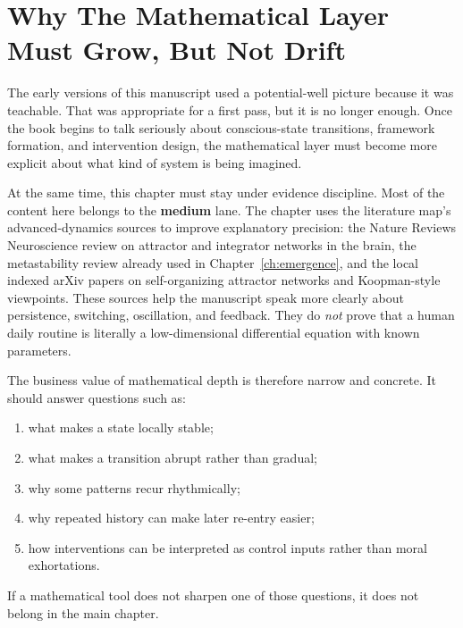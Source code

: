 \section{Why The Mathematical Layer Must Grow, But Not Drift}

The early versions of this manuscript used a potential-well picture because it
was teachable. That was appropriate for a first pass, but it is no longer
enough. Once the book begins to talk seriously about conscious-state
transitions, framework formation, and intervention design, the mathematical
layer must become more explicit about what kind of system is being imagined.

At the same time, this chapter must stay under evidence discipline. Most of the
content here belongs to the \textbf{medium} lane. The chapter uses the
literature map's advanced-dynamics sources to improve explanatory precision:
the Nature Reviews Neuroscience review on attractor and integrator networks in
the brain, the metastability review already used in Chapter~\ref{ch:emergence},
and the local indexed arXiv papers on self-organizing attractor networks and
Koopman-style viewpoints. These sources help the manuscript speak more clearly
about persistence, switching, oscillation, and feedback. They do \emph{not}
prove that a human daily routine is literally a low-dimensional differential
equation with known parameters.

\begin{discussion}
The business value of mathematical depth is therefore narrow and concrete. It
should answer questions such as:
\begin{enumerate}[nosep]
  \item what makes a state locally stable;
  \item what makes a transition abrupt rather than gradual;
  \item why some patterns recur rhythmically;
  \item why repeated history can make later re-entry easier;
  \item how interventions can be interpreted as control inputs rather than
        moral exhortations.
\end{enumerate}
If a mathematical tool does not sharpen one of those questions, it does not
belong in the main chapter.
\end{discussion}
